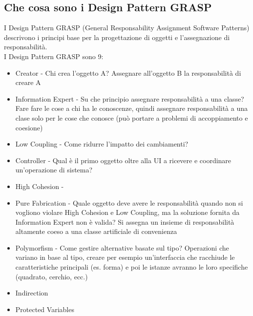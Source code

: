 \documentclass[12pt, a4paper, openany]{book}
\begin{document}
\subsection*{Che cosa sono i Design Pattern GRASP}
I Design Pattern GRASP (General Responsability Assignment Software Patterns) descrivono
i principi base per la progettazione di oggetti e l'assegnazione di responsabilità.\\
I Design Pattern GRASP sono 9:
\begin{itemize}
    \item Creator - Chi crea l'oggetto A? Assegnare all'oggetto B la responsabilità di creare A
    \item Information Expert - Su che principio assegnare responsabilità a una classe?
    Fare fare le cose a chi ha le conoscenze, quindi assegnare responsabilità a una clase solo per le
    cose che conosce (può portare a problemi di accoppiamento e coesione)
    \item Low Coupling - Come ridurre l'impatto dei cambiamenti? 
    \item Controller - Qual è il primo oggetto oltre alla UI a ricevere e coordinare un'operazione di sistema?
    \item High Cohesion -
    \item Pure Fabrication - Quale oggetto deve avere le responsabilità quando non si vogliono violare High Cohesion e 
    Low Coupling, ma la soluzione fornita da Information Expert non è valida? Si assegna un insieme
    di responsabilità altamente coeso a una classe artificiale di convenienza
    \item Polymorfism - Come gestire alternative basate sul tipo? Operazioni che variano in base al tipo,
    creare per esempio un'interfaccia che racchiude le caratteristiche principali (es. forma) e poi le
    istanze avranno le loro specifiche (quadrato, cerchio, ecc.)
    \item Indirection
    \item Protected Variables
\end{itemize} 
\end{document}
